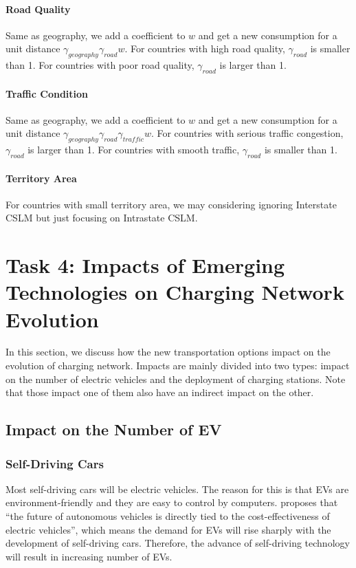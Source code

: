 \documentclass{mcmthesis}
\begin{document}
\paragraph{Road Quality}
Same as geography, we add a coefficient to $w$ and get a new consumption for a unit distance $\gamma_{geography}\gamma_{road}w$. For countries with high road quality, $\gamma_{road}$ is smaller than 1. For countries with poor road quality, $\gamma_{road}$ is larger than 1.

\paragraph{Traffic Condition}
Same as geography, we add a coefficient to $w$ and get a new consumption for a unit distance $\gamma_{geography}\gamma_{road}\gamma_{traffic}w$. For countries with serious traffic congestion, $\gamma_{road}$ is larger than 1. For countries with smooth traffic, $\gamma_{road}$ is smaller than 1.

\paragraph{Territory Area}
For countries with small territory area, we may considering ignoring Interstate CSLM but just focusing on Intrastate CSLM.
\section{Task 4: Impacts of Emerging Technologies on Charging Network Evolution}\label{Sec-Task4}
In this section, we discuss how the new transportation options impact on the evolution of charging network. Impacts are mainly divided into two types: impact on the number of electric vehicles and the deployment of charging stations. Note that those impact one of them also have an indirect impact on the other.
\subsection{Impact on the Number of EV}
\subsubsection*{Self-Driving Cars}
Most self-driving cars will be electric vehicles. The reason for this is that EVs are environment-friendly and they are easy to control by computers. \cite{SelfDriving} proposes that ``the future of autonomous vehicles is directly tied to the cost-effectiveness of electric vehicles'', which means the demand for EVs will rise sharply with the development of self-driving cars. Therefore, the advance of self-driving technology will result in increasing number of EVs.
\end{document}
